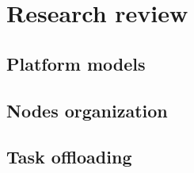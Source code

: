 \chapter{Research review}\label{chapter:Review}
%
%
%



\section{Platform models}\label{sec:platform_models}
%
%



\section{Nodes organization}\label{sec:nodes_organization}
%
%


\section{Task offloading}\label{sec:task_offloading}
%
%



